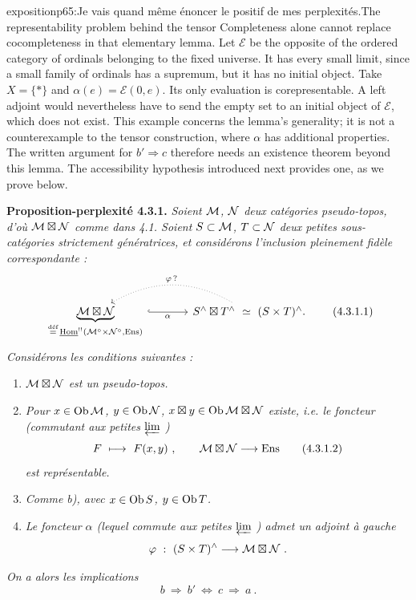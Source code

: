 \begin{dcomment}{exposition}{p65:Je vais quand même énoncer le positif de mes perplexités.}{The representability problem behind the tensor}
Completeness alone cannot replace cocompleteness in that elementary lemma.  Let $\mathcal E$ be the opposite of the ordered category of ordinals belonging to the fixed universe.  It has every small limit, since a small family of ordinals has a supremum, but it has no initial object.  Take $X=\{*\}$ and $\alpha(e)=\mathcal E(0,e)$.  Its only evaluation is corepresentable.  A left adjoint would nevertheless have to send the empty set to an initial object of $\mathcal E$, which does not exist.  This example concerns the lemma's generality; it is not a counterexample to the tensor construction, where $\alpha$ has additional properties.  The written argument for $b'\Rightarrow c$ therefore needs an existence theorem beyond this lemma.  The accessibility hypothesis introduced next provides one, as we prove below.
\end{dcomment}


\textbf{Proposition-perplexité 4.3.1.} \textit{Soient $\mathcal{M}$, $\mathcal{N}$ deux catégories pseudo-topos, d'où $\mathcal{M}\boxtimes\mathcal{N}$ comme dans 4.1. Soient $S\subset\mathcal{M}$, $T\subset\mathcal{N}$ deux petites sous-catégories strictement génératrices, et considérons l'inclusion pleinement fidèle correspondante :}
\[
\begin{tikzcd}[column sep=large]
\underbrace{\cM\bt\cN}_{\defeq\, \uHom^{!!}(\cM^{\circ}\times\cN^{\circ},\Ens)} \arrow[r, hook, "\alpha"'] & S^{\wedge}\bt T^{\wedge} \ \simeq\ (S\times T)^{\wedge}. \arrow[l, dotted, bend right, "\varphi\,?"']
\end{tikzcd}
\tag*{(4.3.1.1)}
\]
\textit{Considérons les conditions suivantes :}
\begin{enumerate}[label={}]
\item[\textit{a)}] \textit{$\mathcal{M}\boxtimes\mathcal{N}$ est un pseudo-topos.}
\item[\textit{b)}] \textit{Pour $x\in\mathrm{Ob}\,\mathcal{M}$, $y\in\mathrm{Ob}\,\mathcal{N}$, $x\boxtimes y\in\mathrm{Ob}\,\mathcal{M}\boxtimes\mathcal{N}$ existe, i.e. le foncteur (commutant aux petites $\varprojlim$ )}
\[
F \ \longmapsto\ F(x,y) \ , \qquad \mathcal{M}\boxtimes\mathcal{N} \longrightarrow \mathrm{Ens}
\tag*{(4.3.1.2)}
\]
\textit{est représentable.}
\item[\textit{b$'$)}] \textit{Comme b), avec $x\in\mathrm{Ob}\, S$, $y\in\mathrm{Ob}\, T$.}
\item[\textit{c)}] \textit{Le foncteur $\alpha$ (lequel commute aux petites $\varprojlim$ ) admet un adjoint à gauche}
\[
\varphi \ :\ (S\times T)^{\wedge} \longrightarrow \mathcal{M}\boxtimes\mathcal{N} \ .
\]
\end{enumerate}
\textit{On a alors les implications}
\[
b \ \Longrightarrow\ b' \ \Longleftrightarrow\ c \ \Longrightarrow\ a \ .
\tag*{(4.3.1.3)}
\]

